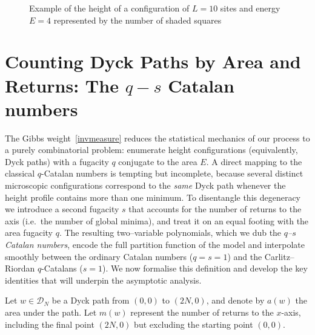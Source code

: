 \documentclass[pdflatex,sn-mathphys-num]{sn-jnl}
\theoremstyle{definition}
\theoremstyle{remark}
\numberwithin{equation}{section}
\begin{document}
\begin{figure}
    \centering

    \caption{Example of the height of a configuration of $L=10$ sites and energy $E=4$ represented by the number of shaded squares}
    \label{fig:Energy}
\end{figure}


\section[Counting Dyck Paths by Area and Returns]{Counting Dyck Paths by Area and Returns: The $q\!-\!s$ Catalan numbers}
\label{sec:qs-catalan}

The Gibbs weight~\eqref{invmeasure} reduces the statistical mechanics of our
process to a purely combinatorial problem: enumerate height
configurations (equivalently, Dyck paths) with a fugacity \(q\) conjugate to the area \(E\).  A direct mapping to the classical
\(q\)-Catalan numbers \cite{CarlitzRiordan1964} is tempting but incomplete, because
several distinct microscopic configurations correspond to the \emph{same} Dyck
path whenever the height profile contains more than one minimum.  To disentangle
this degeneracy we introduce a second fugacity \(s\) that accounts for the number of  
returns to the axis (i.e.\ the number of global minima), and treat it on an equal
footing with the area fugacity \(q\).  The resulting two–variable polynomials,
which we dub the {\it \(q\)–\(s\) Catalan numbers}, encode the full partition
function of the model and interpolate smoothly between the ordinary Catalan
numbers (\(q=s=1\)) and the Carlitz–Riordan \(q\)-Catalans (\(s=1\)).  We now
formalise this definition and develop the key identities that will underpin the
asymptotic analysis.


Let $w \in \mathcal{D}_N$ be a Dyck path from $(0,0)$ to $(2N,0)$, and denote by $a(w)$ the area under the path. Let $m(w)$ represent the number of returns to the $x$-axis, including the final point $(2N,0)$ but excluding the starting point $(0,0)$.
\end{document}

